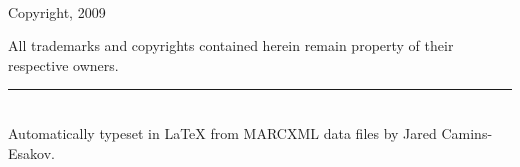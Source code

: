 % 
% 
{\small
~\\[4cm]

\begin{center}
Copyright, 2009\\[2cm]
\end{center}

\begin{flushleft}
All trademarks and copyrights contained herein remain property of their respective owners.

\vfill

\rule{6cm}{0.25mm}\\[0.2cm]
Automatically typeset in {\LaTeX} from MARCXML data files by Jared Camins-Esakov.
\end{flushleft}
}
